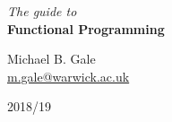 
\begin{titlepage}
	\begin{center}
		
{\Huge \textit{The guide to}} \\[0.2cm]
{\Huge \textbf{Functional Programming}} \\[0.2cm]

\vfill

\scalebox{20.0}{$\lambda$}

\vfill 

{\LARGE Michael B. Gale} \\[0.1cm]
{\large \href{mailto:m.gale@warwick.ac.uk}{m.gale@warwick.ac.uk}}

\vspace{2cm}

{2018/19}
\end{center}
\end{titlepage}